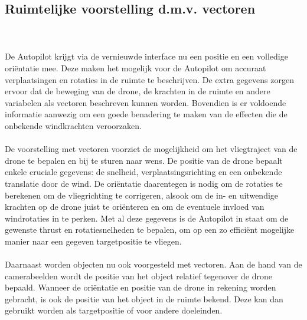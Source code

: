 \subsection{Ruimtelijke voorstelling d.m.v. vectoren}
\\
\\
De Autopilot krijgt via de vernieuwde interface nu een positie en een volledige ori\"entatie mee. Deze maken het mogelijk voor de Autopilot om accuraat verplaatsingen en rotaties in de ruimte te beschrijven. De extra gegevens zorgen ervoor dat de beweging van de drone, de krachten in de ruimte en andere variabelen als vectoren beschreven kunnen worden. Bovendien is er voldoende informatie aanwezig om een goede benadering te maken van de effecten die de onbekende windkrachten veroorzaken.
\\
\\
De voorstelling met vectoren voorziet de mogelijkheid om het vliegtraject van de drone te bepalen en bij te sturen naar wens. De positie van de drone bepaalt enkele cruciale gegevens: de snelheid, verplaatsingsrichting en een onbekende translatie door de wind. De ori\"entatie daarentegen is nodig om de rotaties te berekenen om de vliegrichting te corrigeren, alsook om de in- en uitwendige krachten op de drone juist te ori\"enteren en om de eventuele invloed van windrotaties in te perken. Met al deze gegevens is de Autopilot in staat om de gewenste thrust en rotatiesnelheden te bepalen, om op een zo effici\"ent mogelijke manier naar een gegeven targetpositie te vliegen.
\\
\\
Daarnaast worden objecten nu ook voorgesteld met vectoren. Aan de hand van de camerabeelden wordt de positie van het object relatief tegenover de drone bepaald. Wanneer de ori\"entatie en positie van de drone in rekening worden gebracht, is ook de positie van het object in de ruimte bekend. Deze kan dan gebruikt worden als targetpositie of voor andere doeleinden.
